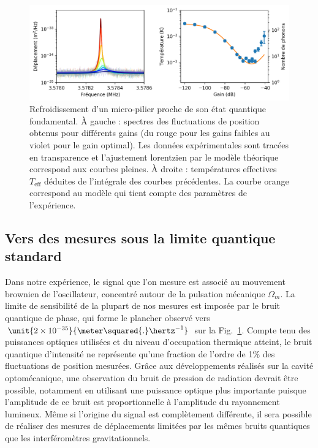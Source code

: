 \documentclass[12pt,a4paper]{article}
\begin{document}
\begin{figure}
\center
\includegraphics[scale=0.75]{figures/feedback_cooling_6phonons.png}
\caption{Refroidissement d'un micro-pilier proche de son état quantique fondamental.
À gauche : spectres des fluctuations de position obtenus pour différents gains (du rouge pour les gains faibles au violet pour le gain optimal).
Les données expérimentales sont tracées en transparence et l'ajustement lorentzien par le modèle théorique correspond aux courbes pleines.
À droite : températures effectives $T_\mathrm{eff}$ déduites de l'intégrale des courbes précédentes.
La courbe orange correspond au modèle qui tient compte des paramètres de l'expérience.}
\label{fig:feedback_cooling_pillar}
\end{figure}

\subsection{Vers des mesures sous la limite quantique standard}
\label{sec:prospects}

Dans notre expérience, le signal que l'on mesure est associé au mouvement brownien de l'oscillateur, concentré autour de la pulsation mécanique $\Omega_m$.
La limite de sensibilité de la plupart de nos mesures est imposée par le bruit quantique de phase, qui forme le plancher observé vers $\unit{2\times10^{-35}}{\meter\squared{.}\hertz^{-1}}$ sur la Fig.~\ref{fig:feedback_cooling_pillar}.
Compte tenu des puissances optiques utilisées et du niveau d'occupation thermique atteint, le bruit quantique d'intensité ne représente qu'une fraction de l'ordre de \unit{1}{\%} des fluctuations de position mesurées.
Grâce aux développements réalisés sur la cavité optomécanique, une observation du bruit de pression de radiation devrait être possible, notamment en utilisant une puissance optique plus importante puisque l'amplitude de ce bruit est proportionnelle à l'amplitude du rayonnement lumineux.
Même si l'origine du signal est complètement différente, il sera possible de réaliser des mesures de déplacements limitées par les mêmes bruits quantiques que les interféromètres gravitationnels.
\end{document}

